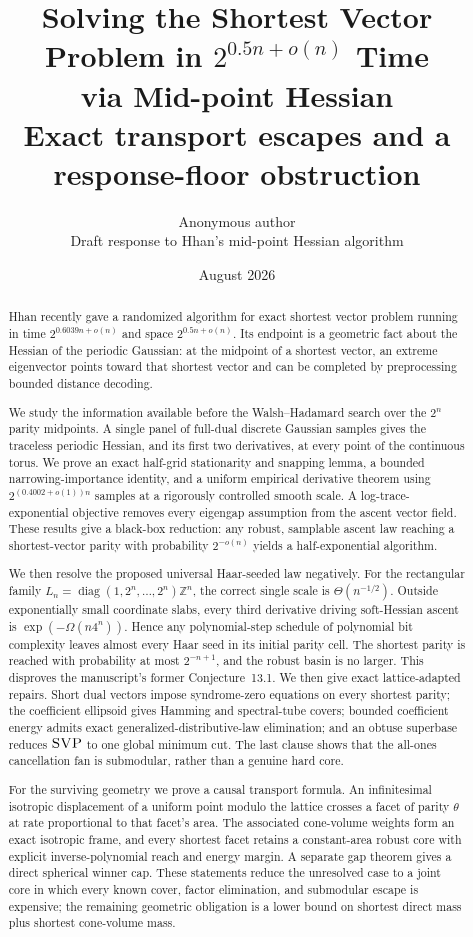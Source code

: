 \documentclass[10pt]{article}
\title{Solving the Shortest Vector Problem in
$2^{0.5n+o(n)}$ Time\\via Mid-point Hessian\\
\large Exact transport escapes and a response-floor obstruction}
\author{Anonymous author\\[2mm]
\small Draft response to Hhan's mid-point Hessian algorithm}
\date{August 2026}
\theoremstyle{definition}
\newcommand{\Z}{\mathbb{Z}}
\newcommand{\SVP}{\textnormal{\textsc{SVP}}}
\begin{document}
\maketitle

\begin{abstract}
Hhan recently gave a randomized algorithm for exact shortest vector problem
running in time $2^{0.6039n+o(n)}$ and space $2^{0.5n+o(n)}$.  Its endpoint is
a geometric fact about the Hessian of the periodic Gaussian: at the midpoint
of a shortest vector, an extreme eigenvector points toward that shortest
vector and can be completed by preprocessing bounded distance decoding.

We study the information available before the Walsh--Hadamard search over the
$2^n$ parity midpoints.  A single panel of full-dual discrete Gaussian
samples gives the traceless periodic Hessian, and its first two derivatives,
at every point of the continuous torus.  We prove an exact half-grid
stationarity and snapping lemma, a bounded narrowing-importance identity,
and a uniform empirical derivative theorem using
$2^{(0.4002+o(1))n}$ samples at a rigorously controlled smooth scale.  A
log-trace-exponential objective removes every eigengap assumption from the
ascent vector field.  These results give a black-box reduction: any robust,
samplable ascent law reaching a shortest-vector parity with probability
$2^{-o(n)}$ yields a half-exponential algorithm.

We then resolve the proposed universal Haar-seeded law negatively.  For the
rectangular family
$L_n=\operatorname{diag}(1,2^n,\ldots,2^n)\Z^n$, the correct single scale is
$\Theta(n^{-1/2})$.  Outside exponentially small coordinate slabs, every
third derivative driving soft-Hessian ascent is
$\exp(-\Omega(n4^n))$.  Hence any polynomial-step schedule of polynomial bit
complexity leaves almost every Haar seed in its initial parity cell.  The
shortest parity is reached with probability at most $2^{-n+1}$, and the
robust basin is no larger.  This disproves the manuscript's former
Conjecture~13.1.  We then give exact lattice-adapted repairs.  Short dual
vectors impose syndrome-zero equations on every shortest parity; the
coefficient ellipsoid gives Hamming and spectral-tube covers; bounded
coefficient energy admits exact generalized-distributive-law elimination;
and an obtuse superbase reduces \(\SVP\) to one global minimum cut.  The last
clause shows that the all-ones cancellation fan is submodular, rather than a
genuine hard core.

For the surviving geometry we prove a causal transport formula.  An
infinitesimal isotropic displacement of a uniform point modulo the lattice
crosses a facet of parity \(\theta\) at rate proportional to that facet's
area.  The associated cone-volume weights form an exact isotropic frame, and
every shortest facet retains a constant-area robust core with explicit
inverse-polynomial reach and energy margin.  A separate gap theorem gives a
direct spherical winner cap.  These statements reduce the unresolved case
to a joint core in which every known cover, factor elimination, and
submodular escape is expensive; the remaining geometric obligation is a
lower bound on shortest direct mass plus shortest cone-volume mass.


\end{abstract}
\end{document}

